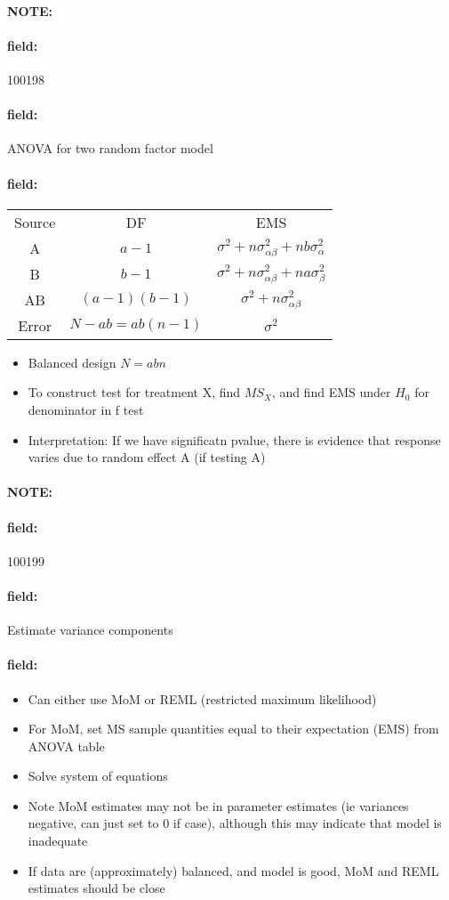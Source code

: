 \documentclass[12pt]{article}
\newenvironment{note}{\paragraph{NOTE:}}{}
\newenvironment{field}{\paragraph{field:}}{}
\begin{document}
\begin{note}
    \begin{field}
        \tiny 100198
    \end{field}
    \begin{field}
        ANOVA for two random factor model
    \end{field}
    \begin{field}
        \begin{tabular}{c c c}
          Source & DF & EMS\\
          A & $a-1$ & $\sigma^2 + n\sigma_{\alpha\beta}^2 + nb \sigma_{\alpha}^2$ \\
          B & $b-1$ & $\sigma^2 + n\sigma_{\alpha\beta}^2 + na \sigma_\beta^2$\\
          AB & $(a-1)(b-1)$ & $\sigma^2 + n\sigma_{\alpha\beta}^2$\\
          Error & $N-ab = ab(n-1)$ & $\sigma^2$
        \end{tabular}
        \begin{itemize}
          \item Balanced design $N = abn$
          \item To construct test for treatment X, find $MS_X$, and find EMS under $H_0$ for denominator in f test
          \item Interpretation: If we have significatn pvalue, there is evidence that response varies due to random effect A (if testing A)
        \end{itemize}
    \end{field}
\end{note}


\begin{note}
    \begin{field}
        \tiny 100199
    \end{field}
    \begin{field}
        Estimate variance components
    \end{field}
    \begin{field}
        \begin{itemize}
          \item Can either use MoM or REML (restricted maximum likelihood)
          \item For MoM, set MS sample quantities equal to their expectation (EMS) from ANOVA table
          \item Solve system of equations
          \item Note MoM estimates may not be in parameter estimates (ie variances negative, can just set to 0 if case), although this may indicate that model is inadequate
          \item If data are (approximately) balanced, and model is good, MoM and REML estimates should be close
        \end{itemize}
    \end{field}
\end{note}
\end{document}
